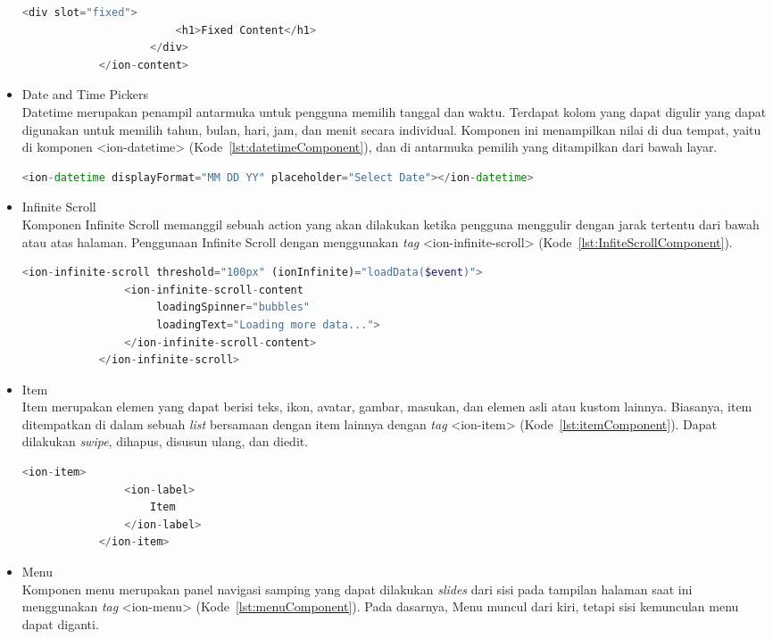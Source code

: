 \begin{itemize}
\begin{lstlisting}[language=php, label={lst:contentComponent}, caption=Potongan Kode Program dari Content Component]
					<div slot="fixed">
						<h1>Fixed Content</h1>
					</div>
			</ion-content>
	\end{lstlisting} 
	\item Date and Time Pickers\\
	Datetime merupakan penampil antarmuka untuk pengguna memilih tanggal dan waktu. Terdapat kolom yang dapat digulir yang dapat digunakan untuk memilih tahun, bulan, hari, jam, dan menit secara individual. Komponen ini menampilkan nilai di dua tempat, yaitu di komponen <ion-datetime> (Kode~\ref{lst:datetimeComponent}), dan di antarmuka pemilih yang ditampilkan dari bawah layar.
		\begin{lstlisting}[language=php, label={lst:datetimeComponent}, caption=Kode Program dari Datetime Component dengan Format Bulan-Hari-Tahun]
			<ion-datetime displayFormat="MM DD YY" placeholder="Select Date"></ion-datetime>
		\end{lstlisting} 
	\item Infinite Scroll	\\
	Komponen Infinite Scroll memanggil sebuah action yang akan dilakukan ketika pengguna menggulir dengan jarak tertentu dari bawah atau atas halaman. Penggunaan Infinite Scroll dengan menggunakan {\it tag} <ion-infinite-scroll> (Kode~\ref{lst:InfiteScrollComponent}). \newpage
	\begin{lstlisting}[language=php, label={lst:InfiteScrollComponent}, caption=Potongan Kode Program dari Infinite Scroll Component]
			<ion-infinite-scroll threshold="100px" (ionInfinite)="loadData($event)">
				<ion-infinite-scroll-content
					 loadingSpinner="bubbles"
					 loadingText="Loading more data...">
				</ion-infinite-scroll-content>
			</ion-infinite-scroll>
	\end{lstlisting} 
	\item Item \\
	Item merupakan elemen yang dapat berisi teks, ikon, avatar, gambar, masukan, dan elemen asli atau kustom lainnya. Biasanya, item ditempatkan di dalam sebuah {\it list} bersamaan dengan item lainnya dengan {\it tag} <ion-item> (Kode~\ref{lst:itemComponent}). Dapat dilakukan {\it swipe}, dihapus, disusun ulang, dan diedit.
	\begin{lstlisting}[language=php, label={lst:itemComponent}, caption=Potongan Kode Program dari Item Component]
			<ion-item>
				<ion-label>
					Item
				</ion-label>
			</ion-item>
	\end{lstlisting} 
	\item Menu \\
	Komponen menu merupakan panel navigasi samping yang dapat dilakukan {\it slides} dari sisi pada tampilan halaman saat ini menggunakan {\it tag} <ion-menu> (Kode~\ref{lst:menuComponent}). Pada dasarnya, Menu muncul dari kiri, tetapi sisi kemunculan menu dapat diganti. 


\end{itemize}
